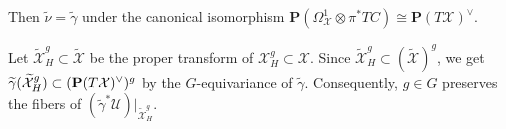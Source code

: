 \documentclass[amscd, leqno]{amsart}
\theoremstyle{plain}
\theoremstyle{definition}
\theoremstyle{remark}
\begin{document}
Then $\widetilde{\nu}=\widetilde{\gamma}$ under the canonical isomorphism 
${\mathbf P}(\Omega^{1}_{\mathcal X}\otimes\pi^{*}TC)\cong{\mathbf P}(T{\mathcal X})^{\lor}$.
\par
Let $\widetilde{\mathcal X}^{g}_{H}\subset\widetilde{\mathcal X}$ be the proper transform of ${\mathcal X}^{g}_{H}\subset{\mathcal X}$.
Since $\widetilde{\mathcal X}^{g}_{H}\subset(\widetilde{\mathcal X})^{g}$, we get 
$\widetilde{\gamma}(\widetilde{\mathcal X}^{g}_{H})\subset({\bf P}(T{\mathcal X})^{\lor})^{g}$ 
by the $G$-equivariance of $\widetilde{\gamma}$.
Consequently, $g\in G$ preserves the fibers of $(\widetilde{\gamma}^{*}{\mathcal U})|_{\widetilde{\mathcal X}^{g}_{H}}$. 




\end{document}

